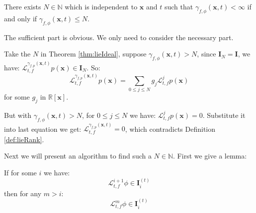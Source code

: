 \documentclass{article}
\begin{document}
\begin{Corollary}
\label{cor:lieRank}
There exists $N \in \mathbb{N}$ which is independent to $\boldsymbol{x}$ and $t$ such that $\gamma_{f, \phi}(\boldsymbol{x}, t) < \infty$ if and only if $\gamma_{f, \phi}(\boldsymbol{x}, t) \leq N$.
\end{Corollary}
\begin{Proof}
The sufficient part is obvious. We only need to consider the necessary part.

Take the $N$ in Theorem \ref{thm:lieIdeal}, suppose $\gamma_{f, \phi}(\boldsymbol{x}, t) > N$, since $\boldsymbol{I}_N = \boldsymbol{I}$, we have:  $\mathcal{L}_{t, f}^{\gamma_{f, p}(\boldsymbol{x}, t)} p(\boldsymbol{x}) \in \boldsymbol{I}_N$. So: 
\begin{equation*}
	 \mathcal{L}_{t, f}^{\gamma_{f, p}(\boldsymbol{x}, t)} p(\boldsymbol{x}) = \sum_{0 \leq j \leq N} g_j \mathcal{L}_{t, f}^j p(\boldsymbol{x})
\end{equation*}
for some $g_j$ in $\mathbb{R}[\boldsymbol{x}]$.

But with $\gamma_{f, \phi}(\boldsymbol{x}, t) > N$, for $0 \leq j \leq N$ we have: $\mathcal{L}_{t, f}^j p(\boldsymbol{x}) = 0$. Substitute it into last equation we get:  $\mathcal{L}_{t, f}^{\gamma_{f, p}(\boldsymbol{x}, t)} = 0$, which contradicts Definition \ref{def:lieRank}.
\end{Proof}

Next we will present an algorithm to find such a $N \in \mathbb{N}$. First we give a lemma: 
\begin{Lemma}
\label{lem:fixed}
If for some $i$ we have: 
	\begin{equation*}
		\mathcal{L}_{t, f}^{i+1} \phi \in \boldsymbol{I}_i^{(t)}
	\end{equation*}
	then for any $m>i$: 
	\begin{equation*}
		\mathcal{L}_{t, f}^{m} \phi \in \boldsymbol{I}_i^{(t)}
	\end{equation*}
\end{Lemma}
\end{document}
